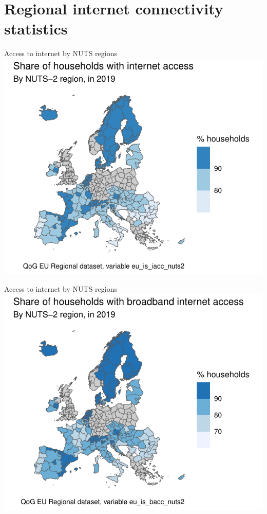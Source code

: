 \documentclass[10pt,handout]{beamer}
\begin{document}
\section{Regional internet connectivity statistics}

\begin{frame}{Access to internet by NUTS regions}
\centering
\includegraphics[width=\textwidth,height=0.9\textheight,keepaspectratio]{nuts_internet_2019.pdf}
\end{frame}

\begin{frame}{Access to internet by NUTS regions}
\centering
\includegraphics[width=\textwidth,height=0.9\textheight,keepaspectratio]{nuts_broadband_2019.pdf}
\end{frame}
\end{document}
